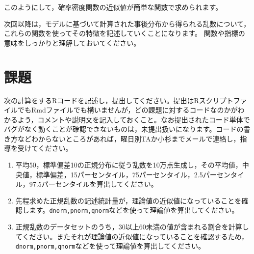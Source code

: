 \documentclass{ltjsbook}
\begin{document}
このようにして，確率密度関数の近似値が簡単な関数で求められます。

次回以降は，モデルに基づいて計算された事後分布から得られる乱数について，これらの関数を使ってその特徴を記述していくことになります。
関数や指標の意味をしっかりと理解しておいてください。
\section{課題}
次の計算をするRコードを記述し，提出してください。提出はRスクリプトファイルでもRmdファイルでも構いませんが，どの課題に対するコードなのかがわかるよう，コメントや説明文を記入しておくこと。なお提出されたコード単体でバグがなく動くことが確認できないものは，未提出扱いになります。コードの書き方などわからないところがあれば，曜日別TAか小杉までメールで連絡し，指導を受けてください。
\begin{enumerate}
 \item 平均50，標準偏差10の正規分布に従う乱数を10万点生成し，その平均値，中央値，標準偏差，15パーセンタイル，75パーセンタイル，2.5パーセンタイル，97.5パーセンタイルを算出してください。
 \item 先程求めた正規乱数の記述統計量が，理論値の近似値になっていることを確認します。\texttt{dnorm,pnorm,qnorm}などを使って理論値を算出してください。
 \item 正規乱数のデータセットのうち，30以上60未満の値が含まれる割合を計算してください。またそれが理論値の近似値になっていることを確認するため，\texttt{dnorm,pnorm,qnorm}などを使って理論値を算出してください。
\end{enumerate}
\end{document}
